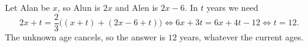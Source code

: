 Let Alan be $x$, so Alun is $2x$ and Alen is $2x-6$. In $t$ years we need
\[2x+t=\dfrac23\bigl((x+t)+(2x-6+t)\bigr)\iff6x+3t=6x+4t-12\iff t=12.\]
The unknown age cancels, so the answer is $\boxed{12}$ years, whatever the current ages.

